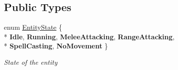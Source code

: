 \subsection*{Public Types}
\begin{DoxyCompactItemize}
\item 
enum \hyperlink{class_hel_project_1_1_game_world_1_1_entities_1_1_h_entity_af0044d8a58b65254f673f8c0ecfecdea}{Entity\+State} \{ \\*
{\bfseries Idle}, 
{\bfseries Running}, 
{\bfseries Melee\+Attacking}, 
{\bfseries Range\+Attacking}, 
\\*
{\bfseries Spell\+Casting}, 
{\bfseries No\+Movement}
 \}
\begin{DoxyCompactList}\small\item\em State of the entity \end{DoxyCompactList}\end{DoxyCompactItemize}
